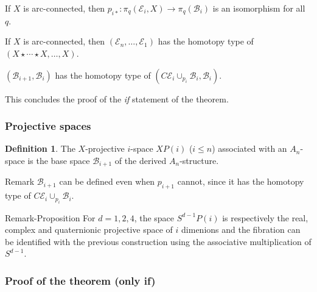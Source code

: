 \documentclass{beamer}
\theoremstyle{definition}
\newtheorem{defi}{Definition}
\begin{document}
\begin{frame}
\begin{theorem}
If $X$ is arc-connected, then $p_{i*}:\pi_q(\mathcal{E}_i,X)\to \pi_q(\mathcal{B}_i)$ is an isomorphism for all $q$. %
\end{theorem}\pause

\begin{theorem}
If $X$ is arc-connected, then $(\mathcal{E}_n, \dots, \mathcal{E}_1)$ has the homotopy type of $(X\star\cdots\star X,\dots, X)$. %
\end{theorem}\pause

\begin{theorem}
$(\mathcal{B}_{i+1},\mathcal{B}_i)$ has the homotopy type of $(C\mathcal{E}_i\cup_{p_i}\mathcal{B}_i,\mathcal{B}_i)$. %
\end{theorem}\pause
This concludes the proof of the \emph{if} statement of the theorem.
\end{frame}
\begin{frame}
\frametitle{Projective spaces}
\begin{defi}
The $X$-projective $i$-space $XP(i)$ ($i\leq n$) associated with an $A_n$-space is the base space $\mathcal{B}_{i+1}$ of the derived $A_n$-structure.
\end{defi}\pause
\begin{block}{Remark}
$\mathcal{B}_{i+1}$ can be defined even when $p_{i+1}$ cannot, since it has the homotopy type of $C\mathcal{E}_i\cup_{p_i}\mathcal{B}_i$.
\end{block}\pause
\begin{block}{Remark-Proposition}%
For $d=1,2,4$, the space $S^{d-1}P(i)$ is respectively the real, complex and quaternionic projective space of $i$ dimenions and the fibration can be identified with the previous construction using the associative multiplication of $S^{d-1}$.
\end{block}
\end{frame}


\begin{frame}
\frametitle{Proof of the theorem (only if)}
\end{frame}
\end{document}

